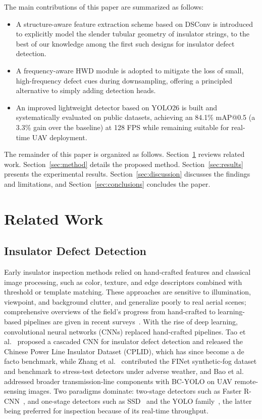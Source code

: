 \documentclass[sensors,article,submit,pdftex,moreauthors]{Definitions/mdpi}
\begin{document}
The main contributions of this paper are summarized as follows:
\begin{itemize}
\item A structure-aware feature extraction scheme based on DSConv is introduced to explicitly model the slender tubular geometry of insulator strings, to the best of our knowledge among the first such designs for insulator defect detection.
\item A frequency-aware HWD module is adopted to mitigate the loss of small, high-frequency defect cues during downsampling, offering a principled alternative to simply adding detection heads.
\item An improved lightweight detector based on YOLO26 is built and systematically evaluated on public datasets, achieving an 84.1\% mAP@0.5 (a 3.3\% gain over the baseline) at 128 FPS while remaining suitable for real-time UAV deployment.
\end{itemize}

The remainder of this paper is organized as follows. Section~\ref{sec:related} reviews related work. Section~\ref{sec:method} details the proposed method. Section~\ref{sec:results} presents the experimental results. Section~\ref{sec:discussion} discusses the findings and limitations, and Section~\ref{sec:conclusions} concludes the paper.

\section{Related Work}\label{sec:related}

\subsection{Insulator Defect Detection}

Early insulator inspection methods relied on hand-crafted features and classical image processing, such as color, texture, and edge descriptors combined with threshold or template matching. These approaches are sensitive to illumination, viewpoint, and background clutter, and generalize poorly to real aerial scenes; comprehensive overviews of the field's progress from hand-crafted to learning-based pipelines are given in recent surveys~\cite{liu2023summary,luo2023uav}. With the rise of deep learning, convolutional neural networks (CNNs) replaced hand-crafted pipelines. Tao et al.~\cite{tao2020detection} proposed a cascaded CNN for insulator defect detection and released the Chinese Power Line Insulator Dataset (CPLID), which has since become a de facto benchmark, while Zhang et al.~\cite{zhang2022finet} contributed the FINet synthetic-fog dataset and benchmark to stress-test detectors under adverse weather, and Bao et al.~\cite{bao2022bcyolo} addressed broader transmission-line components with BC-YOLO on UAV remote-sensing images. Two paradigms dominate: two-stage detectors such as Faster R-CNN~\cite{ren2017faster}, and one-stage detectors such as SSD~\cite{liu2016ssd} and the YOLO family~\cite{redmon2016yolo}, the latter being preferred for inspection because of its real-time throughput.
\end{document}
